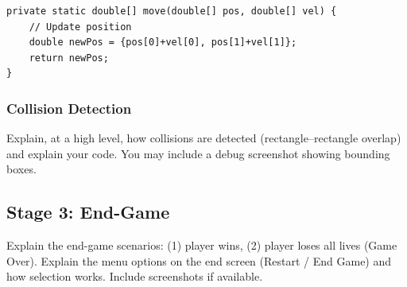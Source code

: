 \documentclass[11pt,a4paper]{article}
\begin{document}
\begin{lstlisting}[caption={Example Function}, label={lst:enemy_move}]
private static double[] move(double[] pos, double[] vel) {
    // Update position
    double newPos = {pos[0]+vel[0], pos[1]+vel[1]};
    return newPos;
}
\end{lstlisting}

\subsubsection{Collision Detection}
Explain, at a high level, how collisions are detected (rectangle--rectangle overlap) and explain your code. You may include a debug screenshot showing bounding boxes.

\subsection{Stage 3: End-Game}
Explain the end-game scenarios:
(1) player wins, (2) player loses all lives (Game Over).
Explain the menu options on the end screen (Restart / End Game) and how selection works.
Include screenshots if available.
\end{document}
